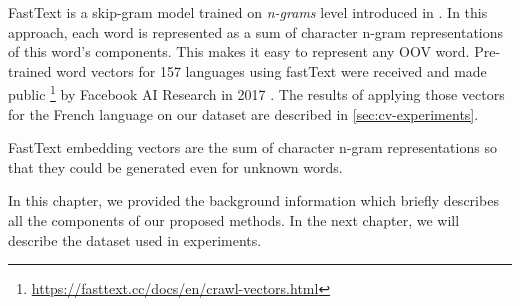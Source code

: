 FastText is a skip-gram model trained on \textit{n-grams} level introduced in \cite{Bojanowski-ACL2017}. In this approach, each word is represented as a sum of character n-gram representations of this word's components. This makes it easy to represent any OOV word. Pre-trained word vectors for 157 languages using fastText were received and made public \footnote{\url{https://fasttext.cc/docs/en/crawl-vectors.html}} by Facebook AI Research in 2017 \citep{Mikolov-2017}. The results of applying those vectors for the French language on our dataset are described in \ref{sec:cv-experiments}.

FastText embedding vectors are the sum of character n-gram representations so that they could be generated even for unknown words. 


\bigskip
In this chapter, we provided the background information which briefly describes all the components of our proposed methods. In the next chapter, we will describe the dataset used in experiments.